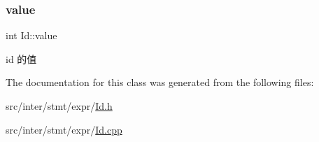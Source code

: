 \subsubsection{\texorpdfstring{value}{value}}
{\footnotesize\ttfamily int Id\+::value}

id 的值 

The documentation for this class was generated from the following files\+:\begin{DoxyCompactItemize}
\item 
src/inter/stmt/expr/\hyperlink{_id_8h}{Id.\+h}\item 
src/inter/stmt/expr/\hyperlink{_id_8cpp}{Id.\+cpp}\end{DoxyCompactItemize}
